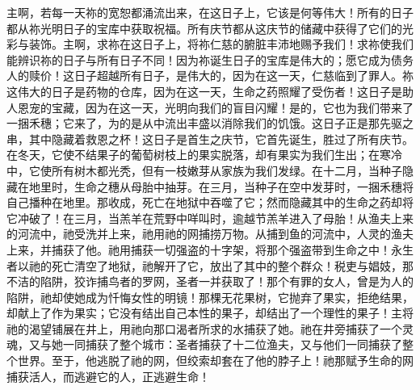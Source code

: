 主啊，若每一天祢的宽恕都涌流出来，在这日子上，它该是何等伟大！所有的日子都从祢光明日子的宝库中获取祝福。所有庆节都从这庆节的储藏中获得了它们的光彩与装饰。主啊，求祢在这日子上，将祢仁慈的腑脏丰沛地赐予我们！求祢使我们能辨识祢的日子与所有日子不同！因为祢诞生日子的宝库是伟大的；愿它成为债务人的赎价！这日子超越所有日子，是伟大的，因为在这一天，仁慈临到了罪人。祢这伟大的日子是药物的仓库，因为在这一天，生命之药照耀了受伤者！这日子是助人恩宠的宝藏，因为在这一天，光明向我们的盲目闪耀！是的，它也为我们带来了一捆禾穗；它来了，为的是从中流出丰盛以消除我们的饥饿。这日子正是那先驱之串，其中隐藏着救恩之杯！这日子是首生之庆节，它首先诞生，胜过了所有庆节。在冬天，它使不结果子的葡萄树枝上的果实脱落，却有果实为我们生出；在寒冷中，它使所有树木都光秃，但有一枝嫩芽从家族为我们发绿。在十二月，当种子隐藏在地里时，生命之穗从母胎中抽芽。在三月，当种子在空中发芽时，一捆禾穗将自己播种在地里。那收成，死亡在地狱中吞噬了它；然而隐藏其中的生命之药却将它冲破了！在三月，当羔羊在荒野中咩叫时，逾越节羔羊进入了母胎！从渔夫上来的河流中，祂受洗并上来，祂用祂的网捕捞万物。从捕到鱼的河流中，人灵的渔夫上来，并捕获了他。祂用捕获一切强盗的十字架，将那个强盗带到生命之中！永生者以祂的死亡清空了地狱，祂解开了它，放出了其中的整个群众！税吏与娼妓，那不洁的陷阱，狡诈捕鸟者的罗网，圣者一并获取了！那个有罪的女人，曾是为人的陷阱，祂却使她成为忏悔女性的明镜！那棵无花果树，它抛弃了果实，拒绝结果，却献上了作为果实；它没有结出自己本性的果子，却结出了一个理性的果子！主将祂的渴望铺展在井上，用祂向那口渴者所求的水捕获了她。祂在井旁捕获了一个灵魂，又与她一同捕获了整个城市：圣者捕获了十二位渔夫，又与他们一同捕获了整个世界。至于，他逃脱了祂的网，但绞索却套在了他的脖子上！祂那赋予生命的网捕获活人，而逃避它的人，正逃避生命！\par

